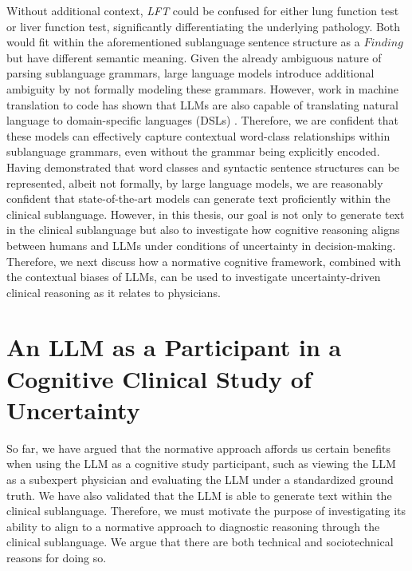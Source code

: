 Without additional context, \emph{LFT} could be confused for either lung function test or liver function test, significantly differentiating the underlying pathology. Both would fit within the aforementioned sublanguage sentence structure as a $Finding$ but have different semantic meaning. Given the already ambiguous nature of parsing sublanguage grammars, large language models introduce additional ambiguity by not formally modeling these grammars. However, work in machine translation to code has shown that LLMs are also capable of translating natural language to domain-specific languages (DSLs) \cite{shin-etal-2021-constrained, wangGrammarPromptingDomainspecific2024}. Therefore, we are confident that these models can effectively capture contextual word-class relationships within sublanguage grammars, even without the grammar being explicitly encoded. Having demonstrated that word classes and syntactic sentence structures can be represented, albeit not formally, by large language models, we are reasonably confident that state-of-the-art models can generate text proficiently within the clinical sublanguage. However, in this thesis, our goal is not only to generate text in the clinical sublanguage but also to investigate how cognitive reasoning aligns between humans and LLMs under conditions of uncertainty in decision-making. Therefore, we next discuss how a normative cognitive framework, combined with the contextual biases of LLMs, can be used to investigate uncertainty-driven clinical reasoning as it relates to physicians.



\section{An LLM as a Participant in a Cognitive Clinical Study of Uncertainty}
So far, we have argued that the normative approach affords us certain benefits when using the LLM as a cognitive study participant, such as viewing the LLM as a subexpert physician and evaluating the LLM under a standardized ground truth. We have also validated that the LLM is able to generate text within the clinical sublanguage. Therefore, we must motivate the purpose of investigating its ability to align to a normative approach to diagnostic reasoning through the clinical sublanguage. We argue that there are both technical and sociotechnical reasons for doing so. 

